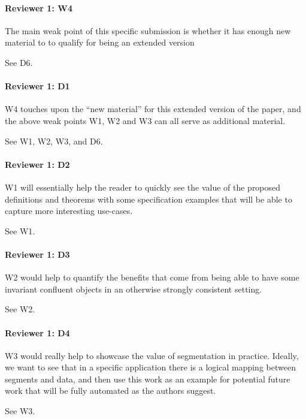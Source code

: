 \documentclass[9pt]{article}
\begin{document}
\begin{multicols*}{2}
\paragraph{Reviewer 1: W4}
\begin{feedback}
  The main weak point of this specific submission is whether it has enough new
  material to to qualify for being an extended version
\end{feedback}
See D6.

\paragraph{Reviewer 1: D1}
\begin{feedback}
  W4 touches upon the ``new material'' for this extended version of the paper,
  and the above weak points W1, W2 and W3 can all serve as additional material.
\end{feedback}
See W1, W2, W3, and D6.

\paragraph{Reviewer 1: D2}
\begin{feedback}
  W1 will essentially help the reader to quickly see the value of the proposed
  definitions and theorems with some specification examples that will be able
  to capture more interesting use-cases.
\end{feedback}
See W1.

\paragraph{Reviewer 1: D3}
\begin{feedback}
  W2 would help to quantify the benefits that come from being able to have some
  invariant confluent objects in an otherwise strongly consistent setting.
\end{feedback}
See W2.

\paragraph{Reviewer 1: D4}
\begin{feedback}
  W3 would really help to showcase the value of segmentation in practice.
  Ideally, we want to see that in a specific application there is a logical
  mapping between segments and data, and then use this work as an example for
  potential future work that will be fully automated as the authors suggest.
\end{feedback}
See W3.


\end{multicols*}
\end{document}
